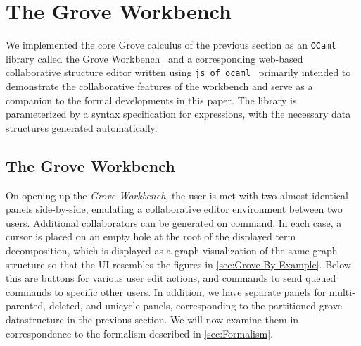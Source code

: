 
\section{The Grove Workbench}%
\label{sec:Implementation}

We implemented the core Grove calculus of the previous section as an \texttt{OCaml} library called the Grove Workbench~\cite{grove-artifact} and a corresponding web-based collaborative structure editor written using \texttt{js\_of\_ocaml}~\cite{DBLP:journals/spe/VouillonB14} primarily intended to demonstrate the collaborative features of the workbench and serve as a companion to the formal developments in this paper. The library is parameterized by a syntax specification for expressions, with the necessary data structures generated automatically.

\subsection{The Grove Workbench}
\label{sub:impl-grv}

On opening up the \emph{Grove Workbench}, the user is met with two almost identical panels side-by-side, emulating a collaborative editor environment between two users. Additional collaborators can be generated on command. In each case, a cursor is placed on an empty hole at the root of the displayed term decomposition, which is displayed as a graph visualization of the same graph structure so that the UI resembles the figures in \autoref{sec:Grove By Example}. Below this are buttons for various user edit actions, and commands to send queued commands to specific other users. In addition, we have separate panels for multi-parented, deleted, and unicycle panels, corresponding to the partitioned grove datastructure in the previous section. We will now examine them in correspondence to the formalism described in \autoref{sec:Formalism}. 



